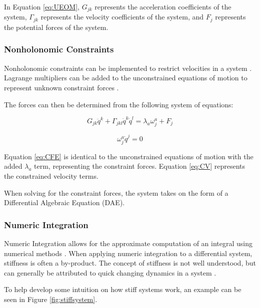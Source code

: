 In Equation \ref{eq:UEOM}, $G_{jk}$ represents the acceleration coefficients of the system, $\Gamma_{jk}$ represents the velocity coefficients of the system, and $F_j$ represents the potential forces of the system.

\subsubsection{Nonholonomic Constraints}

Nonholonomic constraints can be implemented to restrict velocities in a system \cite{LagrangeEquations}.
Lagrange multipliers can be added to the unconstrained equations of motion to represent unknown constraint forces \cite{ClassicalMechanics}.
\par
The forces can then be determined from the following system of equations:

\begin{equation}
\label{eq:CFE}
G_{jk} \ddot{q}^k + \Gamma_{jkl} \dot{q}^k\dot{q}^l  = \lambda_{a}\omega_{j}^{a} + F_{j}
\end{equation}

\begin{equation}
\label{eq:CV}
\omega_{j}^{a} \dot{q}^{j} = 0
\end{equation}

Equation \ref{eq:CFE} is identical to the unconstrained equations of motion with the added $\lambda_{a}$ term, representing the constraint forces.
Equation \ref{eq:CV} represents the constrained velocity terms. 
\par
When solving for the constraint forces, the system takes on the form of a Differential Algebraic Equation (DAE).

\subsubsection{Numeric Integration}

Numeric Integration allows for the approximate computation of an integral using numerical methods \cite{WolframNumeric}.
When applying numeric integration to a differential system, stiffness is often a by-product.
The concept of stiffness is not well understood, but can generally be attributed to quick changing dynamics in a system \cite{StiffSystem}.
\par
To help develop some intuition on how stiff systems work, an example can be seen in Figure \ref{fig:stiffsystem}.

